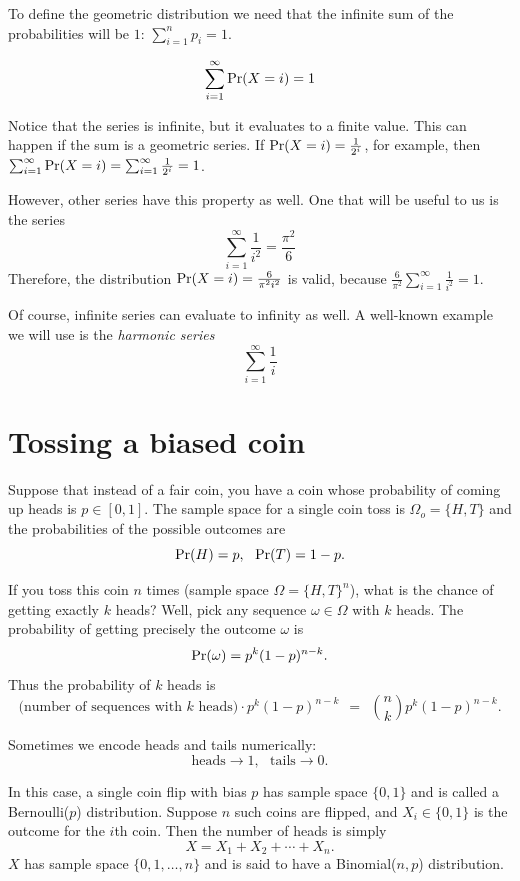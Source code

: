 To define the geometric distribution we need that the infinite sum of
the probabilities will be $1$: $\sum_{i=1}^n p_i =1$.




$$ \sum_{i=1}^\infty \mbox{\rm Pr}(X = i) = 1 $$

Notice that the series is infinite, but it evaluates to a finite value. 
This can happen if the sum is a geometric series. 
If $\mbox{\rm Pr}(X = i) = \frac{1}{2^i} $, for example, then $ \sum_{i=1}^\infty \mbox{\rm Pr}(X = i) = \sum_{i=1}^\infty \frac{1}{2^i} = 1 $. 

However, other series have this property as well. 
One that will be useful to us is the series
$$ \sum_{i=1}^\infty \frac{1}{i^2} = \frac{\pi^2}{6} $$
Therefore, the distribution $\mbox{\rm Pr}(X = i) = \frac{6}{\pi^2 i^2}$ is valid, because $ \frac{6}{\pi^2} \sum_{i=1}^\infty \frac{1}{i^2} = 1 $.

Of course, infinite series can evaluate to infinity as well. 
A well-known example we will use is the \emph{harmonic series}
$$ \sum_{i=1}^\infty \frac{1}{i} $$




\section{Tossing a biased coin}
\label{sec:BaisedCoin}

Suppose that instead of a fair coin, you have a coin whose probability of coming up heads is $p \in [0,1]$. The sample space for a single coin toss is $\Omega_o = \{H,T\}$ and the probabilities of the possible outcomes are
$$ \mbox{\rm Pr}(H) = p, \ \ \mbox{\rm Pr}(T) = 1-p.$$

If you toss this coin $n$ times (sample space $\Omega = \{H,T\}^n$), what is the chance of getting exactly $k$ heads? Well, pick any sequence $\omega \in \Omega$ with $k$ heads. The probability of getting precisely the outcome $\omega$ is
$$ \mbox{\rm Pr}(\omega) = p^k (1-p)^{n-k} .$$
Thus the probability of $k$ heads is
$$ \mbox{(number of sequences with $k$ heads)} \cdot p^k (1-p)^{n-k} 
\ \ = \ \ 
{n \choose k} p^k (1-p)^{n-k} .$$

Sometimes we encode heads and tails numerically:
$$ \mbox{heads} \rightarrow 1, \ \ \ \mbox{tails} \rightarrow 0 .$$

In this case, a single coin flip with bias $p$ has sample space $\{0,1\}$ and is called a Bernoulli($p$) distribution. Suppose $n$ such coins are flipped, and $X_i \in \{0,1\}$ is the outcome for the $i$th coin. Then the number of heads is simply 
$$ X = X_1 + X_2 + \cdots + X_n. $$
$X$ has sample space $\{0,1,\ldots,n\}$ and is said to have a Binomial($n,p$) distribution.



